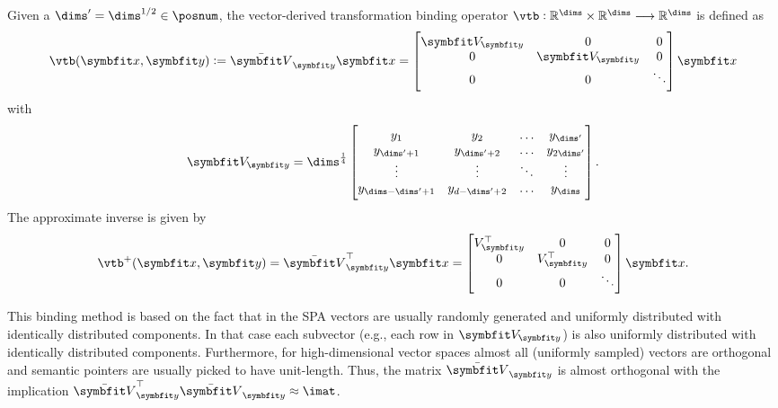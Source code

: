 \begin{defn}
    Given a $\dims' = \dims^{1/2} \in \posnum$, the vector-derived transformation binding operator $\vtb: \mathbb{R}^{\dims} \times \mathbb{R}^{\dims} \longrightarrow \mathbb{R}^{\dims}$ is defined as
    \begin{equation}
        \vtb(\vc x, \vc y) := \bar{\mat V}_{\vc y} \vc x = \begin{bmatrix}
            \mat V_{\vc y} & 0 & 0 \\
            0 & \mat V_{\vc y} & 0 \\
            0 & 0 & \ddots
        \end{bmatrix} \vc x
    \end{equation}
    with
    \begin{equation}
        \mat V_{\vc y} = \dims^{\frac{1}{4}} \begin{bmatrix}
            y_1 & y_2 & \dotso & y_{\dims'} \\
            y_{\dims' + 1} & y_{\dims' + 2} & \dotso & y_{2\dims'} \\
            \vdots & \vdots & \ddots & \vdots \\
            y_{\dims - \dims' + 1} & y_{d - \dims' + 2} & \dotso & y_{\dims}
        \end{bmatrix} \text{.}
    \end{equation}
    The approximate inverse is given by
    \begin{equation}
        \vtb^+(\vc x, \vc y) = \bar{\mat V}_{\vc y}\Tr \vc x = \begin{bmatrix}
            V_{\vc y}\Tr & 0 & 0 \\
            0 & V_{\vc y}\Tr & 0 \\
            0 & 0 & \ddots
        \end{bmatrix} \vc x \text{.}
    \end{equation}
\end{defn}
This binding method is based on the fact that in the SPA vectors are usually randomly generated and uniformly distributed with identically distributed components.
In that case each subvector (e.g., each row in $\mat V_{\vc y}$) is also uniformly distributed with identically distributed components.
Furthermore, for high-dimensional vector spaces almost all (uniformly sampled) vectors are orthogonal and semantic pointers are usually picked to have unit-length.
Thus, the matrix $\bar{\mat V}_{\vc y}$ is almost orthogonal with the implication $\bar{\mat V}_{\vc y}\Tr \bar{\mat V}_{\vc y} \approx \imat$.
